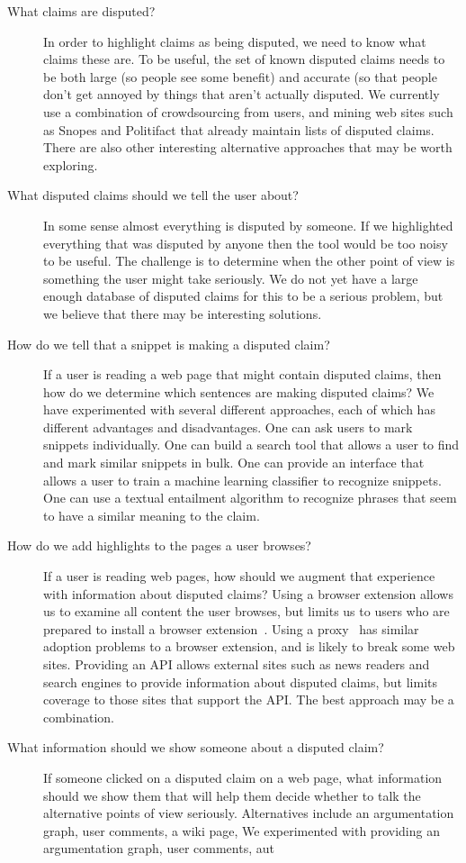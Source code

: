 \documentclass{www2010-submission}
\begin{document}
\begin{description}
\item[What claims are disputed?] In order to highlight claims as being disputed, we need to know what claims these are. To be useful, the set of known disputed claims needs to be both large (so people see some benefit) and accurate (so that people don't get annoyed by things that aren't actually disputed. We currently use a combination of crowdsourcing from users, and mining web sites such as Snopes and Politifact that already maintain lists of disputed claims. There are also other interesting alternative approaches that may be worth exploring. 

\item[What disputed claims should we tell the user about?] In some sense almost everything is disputed by someone. If we highlighted everything that was disputed by anyone then the tool would be too noisy to be useful. The challenge is to determine when the other point of view is something the user might take seriously. We do not yet have a large enough database of disputed claims for this to be a serious problem, but we believe that there may be interesting solutions.

\item[How do we tell that a snippet is making a disputed claim?] If a user is reading a web page that might contain disputed claims, then how do we determine which sentences are making disputed claims? We have experimented with several different approaches, each of which has different advantages and disadvantages. One can ask users to mark snippets individually. One can build a search tool that allows a user to find and mark similar snippets in bulk. One can provide an interface that allows a user to train a machine learning classifier to recognize snippets. One can use a textual entailment algorithm to recognize phrases that seem to have a similar meaning to the claim. 

\item[How do we add highlights to the pages a user browses?] If a user is reading web pages, how should we augment that experience with information about disputed claims? Using a browser extension allows us to examine all content the user browses, but limits us to users who are prepared to install a browser extension~\cite{nolike-extension?}. Using a proxy~\cite{proxy?} has similar adoption problems to a browser extension, and is likely to break some web sites. Providing an API allows external sites such as news readers and search engines to provide information about disputed claims, but limits coverage to those sites that support the API. The best approach may be a combination.

\item[What information should we show someone about a disputed claim?] If someone clicked on a disputed claim on a web page, what information should we show them that will help them decide whether to talk the alternative points of view seriously. Alternatives include an argumentation graph, user comments, a wiki page, 
We experimented with providing an argumentation graph, user comments, aut
\end{description}
\end{document}

